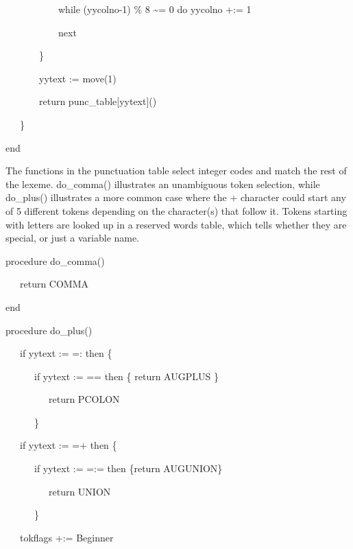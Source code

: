 {\ttfamily\mdseries
\ \ \ \ \ \ \ \ \ \ \ while (yycolno-1) \% 8 \~{}= 0 do yycolno +:= 1}

{\ttfamily\mdseries
\ \ \ \ \ \ \ \ \ \ \ next}

{\ttfamily\mdseries
\ \ \ \ \ \ \ \}}


\bigskip

{\ttfamily\mdseries
\ \ \ \ \ \ \ yytext := move(1)}

{\ttfamily\mdseries
\ \ \ \ \ \ \ return punc\_table[yytext]()}

{\ttfamily\mdseries
\ \ \ \}}

{\ttfamily\mdseries
end}


The functions in the punctuation table select integer codes and match
the rest of the lexeme. do\_comma() illustrates an unambiguous token
selection, while do\_plus() illustrates a more common case where the
{\textquotedbl}+{\textquotedbl} character could start any of 5
different tokens depending on the character(s) that follow it. Tokens
starting with {\textquotedbl}letters{\textquotedbl} are looked up in a
reserved words table, which tells whether they are special, or just a
variable name.

{\ttfamily\mdseries
procedure do\_comma()}

{\ttfamily\mdseries
\ \ \ return COMMA}

{\ttfamily\mdseries
end}


\bigskip

{\ttfamily\mdseries
procedure do\_plus()}

{\ttfamily\mdseries
\ \ \ if yytext {\textbar}{\textbar}:= ={\textquotedbl}:{\textquotedbl} then \{}

{\ttfamily\mdseries
\ \ \ \ \ \ if yytext {\textbar}{\textbar}:= ={\textquotedbl}={\textquotedbl} then \{ return AUGPLUS \}}

{\ttfamily\mdseries
\ \ \ \ \ \ \ \ \ return PCOLON}

{\ttfamily\mdseries
\ \ \ \ \ \ \}}

{\ttfamily\mdseries
\ \ \ if yytext {\textbar}{\textbar}:= ={\textquotedbl}+{\textquotedbl} then \{}

{\ttfamily\mdseries
\ \ \ \ \ \ if yytext {\textbar}{\textbar}:= ={\textquotedbl}:={\textquotedbl} then \{return AUGUNION\}}

{\ttfamily\mdseries
\ \ \ \ \ \ \ \ \ return UNION}

{\ttfamily\mdseries
\ \ \ \ \ \ \}}

{\ttfamily\mdseries
\ \ \ tokflags +:= Beginner}

